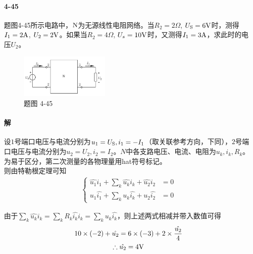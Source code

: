 \documentclass[hyperref, UTF8]{ctexart}
\newcommand{\volt}{{\rm V}}
\newcommand{\source}{{\rm S}}
\newcommand{\ampere}{{\rm A}}
\newcommand{\ohm}{\Omega}
\begin{document}
\paragraph{4-45}\label{4-45}
题图4-45所示电路中，$\rm N$为无源线性电阻网络。当$R_2=2\ohm$, $U_\source=6\volt$时，测得$I_1=2\ampere$, $U_2=2\volt$。如果当$R_2=4\ohm$, $U_s=10\volt$时，又测得$I_1=3\ampere$，求此时的电压$U_2$。

\begin{figure}[!htb]
\centering
\includegraphics[width=0.387\textwidth]{p4-45.png}
\caption*{题图 4-45}
\end{figure}

\paragraph{解}
设$1$号端口电压与电流分别为$u_1=U_\source, i_1=-I_1$（取关联参考方向，下同），$2$号端口电压与电流分别为$u_2=U_2, i_2=I_2$。$N$中各支路电压、电流、电阻为$u_k, i_k, R_k$。为易于区分，第二次测量的各物理量用hat符号标记。\\

则由特勒根定理可知
\begin{gather*}
\left\{\begin{aligned}
\hat{u_1}i_1 + \sum_{k}\hat{u_k}i_k + \hat{u_2}i_2 &= 0 \\
u_1\hat{i_1} + \sum_{k}u_k\hat{i_k} + u_2\hat{i_2} &= 0
\end{aligned}\right.
\end{gather*}

由于$\sum_{k}\hat{u_k}i_k = \sum_{k}R_k\hat{i_k}i_k = \sum_{k}u_k\hat{i_k}$，则上述两式相减并带入数值可得
\begin{gather*}
10\times (-2) + \hat{u_2} = 6 \times (-3) + 2 \times \frac{\hat{u_2}}{4} \\
\therefore \hat{u_2}=4\volt
\end{gather*}
\end{document}
